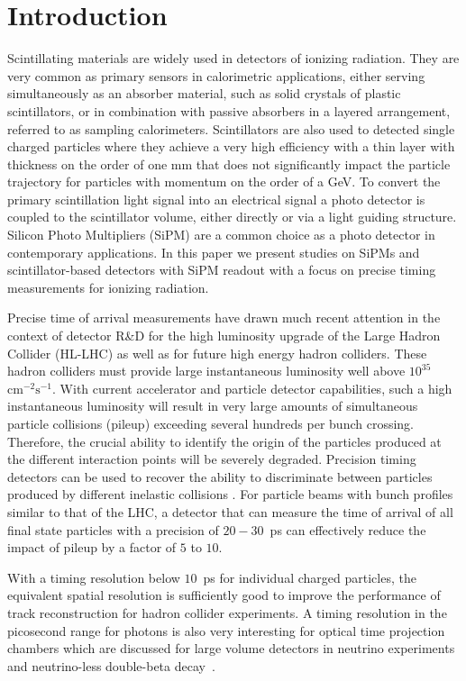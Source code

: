 \section{Introduction}
\label{sec:introduction}

Scintillating materials are widely used in detectors of ionizing radiation. They
are very common as primary sensors in calorimetric applications, either serving
simultaneously as an absorber material, such as solid crystals of plastic
scintillators, or in combination with passive absorbers in a layered
arrangement, referred to as sampling calorimeters. Scintillators are also used
to detected single charged particles where they achieve a very high efficiency
with a thin layer with thickness on the order of one mm that does not significantly
impact the particle trajectory for particles with momentum on the order of a GeV. To
convert the primary scintillation light signal into an electrical signal a photo
detector is coupled to the scintillator volume, either directly or via a light
guiding structure. Silicon Photo Multipliers (SiPM) are a common choice as a
photo detector in contemporary applications. In this paper we present studies on
SiPMs and scintillator-based detectors with SiPM readout with a focus on precise
timing measurements for ionizing radiation. 

Precise time of arrival measurements have drawn much recent attention in the 
context of detector R\&D for the high luminosity upgrade of the Large Hadron 
Collider (HL-LHC) as well as for future high energy hadron colliders.  
These hadron colliders must provide large 
instantaneous luminosity well above $10^{35}$~$\mathrm{cm}^{-2}\mathrm{s}^{-1}$.
With current accelerator and particle detector capabilities, such a high 
instantaneous luminosity will result in very large amounts
of simultaneous particle collisions (pileup) exceeding several hundreds per
bunch crossing. Therefore, the crucial ability to identify the origin 
of the particles produced at the different interaction points will be severely 
degraded. Precision timing detectors can be used to recover the ability to 
discriminate between particles produced by different inelastic collisions \cite{adielba}.
For particle beams with bunch profiles similar to that of the LHC, a detector 
that can measure the time of arrival of all final state particles 
with a precision of $20-30$~ps can effectively reduce the impact of
pileup by a factor of $5$ to $10$. 

With a timing resolution below $10$~ps for individual charged particles, the
equivalent spatial resolution is sufficiently good to improve the performance of
track reconstruction \cite{Neri:2016bng} for hadron collider experiments. A timing
resolution in the picosecond range for photons is also very interesting for optical time
projection chambers which are discussed for large volume detectors in neutrino
experiments and neutrino-less double-beta decay~\cite{Aberle:2013jba, otpc}. 

